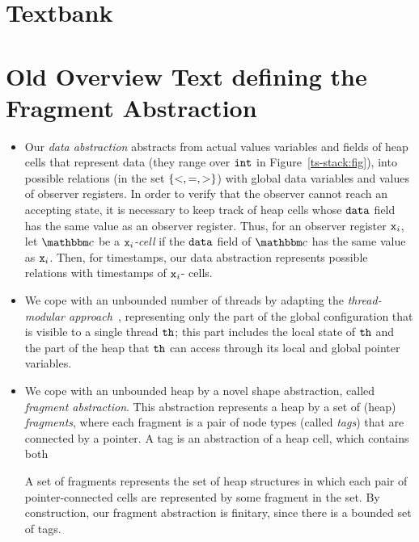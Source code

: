 \section{Textbank}

\section{Old Overview Text defining the Fragment Abstraction}

\begin{itemize}
  \item
    Our {\em data abstraction} abstracts from actual values variables and
    fields of heap cells that represent data (they range over $\tt int$
    in Figure~\ref{ts-stack:fig}),
    into possible relations
    (in the set $\left\{<,=,>\right\}$) with global data variables and values of
    observer registers. 
    In order to verify that the observer cannot reach an accepting state,
    it is necessary to
    keep track of heap cells whose ${\tt data}$ field has the same value as an
    observer register. Thus, 
    for an observer register $\mathtt{x}_i$, let $\cell$ be a {\em $\mathtt{x}_i$-cell} if
    the ${\tt data}$ field of $\cell$ has the same value as $\mathtt{x}_i$.
    Then, for timestamps, our data abstraction represents
    possible relations with timestamps of $\mathtt{x}_i$- cells.
  \item
We cope with an unbounded number of threads by
adapting the {\em thread-modular approach}~\cite{BLMRS:cav08},
representing only the part of the global configuration that is visible to
a single thread ${\tt th}$; this part includes the local state of ${\tt th}$ and
the part of the heap that ${\tt th}$ can access through its local
and global pointer variables.
\item
  We cope with an unbounded heap by a novel shape abstraction, 
called {\em fragment abstraction}. This abstraction 
represents a heap by a set of (heap) {\em fragments}, where each fragment is
a pair of node types (called {\em tags}) that are connected by a pointer.
A tag is an abstraction of a heap cell, which contains both 
A set of fragments represents the set of heap structures in which each
pair of pointer-connected cells are represented by some fragment in the set.
By construction, our fragment abstraction is finitary, since there is
a bounded set of tags.
\end{itemize}
